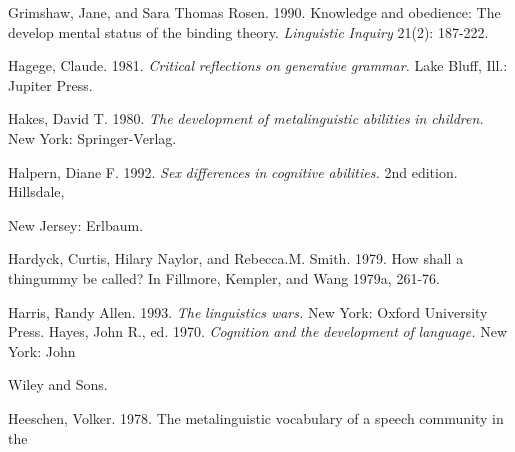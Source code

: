 \begin{styleStandard}
Grimshaw, Jane, and Sara Thomas Rosen. 1990. Knowledge and obedience: The develop\- mental status of the binding theory. \textit{Linguistic}\textit{ }\textit{Inquiry}\textit{ }21(2): 187-222.
\end{styleStandard}


\begin{styleStandard}
Hagege, Claude. 1981. \textit{Critical}\textit{ }\textit{reflections}\textit{ }\textit{on}\textit{ }\textit{generative}\textit{ }\textit{grammar.}\textit{ }Lake Bluff, Ill.: Jupiter Press.
\end{styleStandard}


\begin{styleStandard}
Hakes, David T. 1980. \textit{The}\textit{ }\textit{development}\textit{ }\textit{of metalinguistic}\textit{ }\textit{abilities}\textit{ }\textit{in}\textit{ }\textit{children.}\textit{ }New York: Springer-Verlag.
\end{styleStandard}


\begin{styleStandard}
Halpern, Diane F. 1992. \textit{Sex}\textit{ }\textit{differences}\textit{ }\textit{in}\textit{ }\textit{cognitive abilities. }2nd edition. Hillsdale,
\end{styleStandard}


\begin{styleStandard}
New Jersey: Erlbaum.
\end{styleStandard}


\begin{styleStandard}
Hardyck, Curtis, Hilary Naylor, and Rebecca.M. Smith. 1979. How shall a thingummy be called? In Fillmore, Kempler, and Wang 1979a, 261-76.
\end{styleStandard}


\begin{styleStandard}
Harris, Randy Allen. 1993. \textit{The}\textit{ }\textit{linguistics wars.}\textit{ }New York: Oxford University Press. Hayes, John R., ed. 1970. \textit{Cognition}\textit{ }\textit{and}\textit{ }\textit{the}\textit{ }\textit{development}\textit{ }\textit{of}\textit{ }\textit{language.}\textit{ }New York: John
\end{styleStandard}


\begin{styleStandard}
Wiley and Sons.
\end{styleStandard}


\begin{styleStandard}
Heeschen, Volker. 1978. The metalinguistic vocabulary of a speech community in the
\end{styleStandard}


